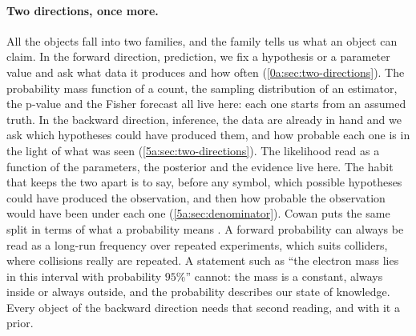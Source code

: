 \paragraph{Two directions, once more.}
All the objects fall into two families, and the family tells us what an object can
claim. In the forward direction, prediction, we fix a hypothesis or a parameter value
and ask what data it produces and how often (\cref{0a:sec:two-directions}). The
probability mass function of a count, the sampling distribution of an estimator, the
p-value and the Fisher forecast all live here: each one starts from an assumed truth.
In the backward direction, inference, the data are already in hand and we ask which
hypotheses could have produced them, and how probable each one is in the light of what
was seen (\cref{5a:sec:two-directions}). The likelihood read as a function of the
parameters, the posterior and the evidence live here. The habit that keeps the two
apart is to say, before any symbol, which possible hypotheses could have produced the
observation, and then how probable the observation would have been under each one
(\cref{5a:sec:denominator}). Cowan puts the same split in terms of what a probability
means . A forward probability can always be read as a
long-run frequency over repeated experiments, which suits colliders, where collisions
really are repeated. A statement such as ``the electron mass lies in this interval with
probability $95\%$'' cannot: the mass is a constant, always inside or always outside,
and the probability describes our state of knowledge. Every object of the backward
direction needs that second reading, and with it a prior.

